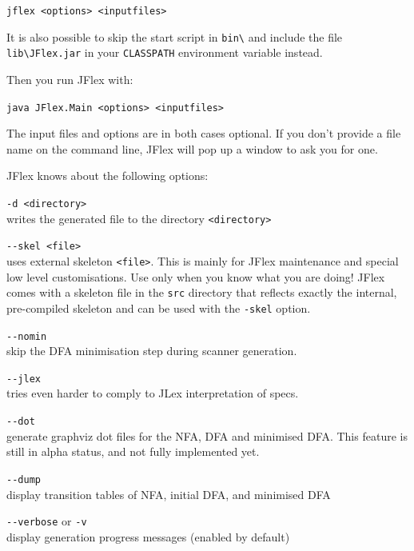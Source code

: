 \documentclass[11pt]{scrartcl}
\begin{document}
\texttt{jflex <options> <inputfiles>}

It is also possible to skip the start script in \verb+bin\+
and include the file \verb+lib\JFlex.jar+
in your \texttt{CLASSPATH} environment variable instead.

Then you run JFlex with:

\texttt{java JFlex.Main <options> <inputfiles>}

The input files and options are in both cases optional. If you don't provide a file name on
the command line, JFlex will pop up a window to ask you for one.

JFlex knows about the following options:

\begin{description}
\item \verb+-d <directory>+\\
  writes the generated file to the directory \verb+<directory>+
  

\item \verb+--skel <file>+\\
  uses external skeleton \verb+<file>+. This is mainly for JFlex
  maintenance and special low level customisations. Use only when you
  know what you are doing! JFlex comes with a skeleton file in the
  \texttt{src} directory that reflects exactly the internal, pre-compiled
  skeleton and can be used with the \texttt{-skel} option.

\item \verb+--nomin+\\
  skip the DFA minimisation step during scanner generation.

\item \verb+--jlex+\\
  tries even harder to comply to JLex interpretation of specs.

\item \verb+--dot+\\
  generate graphviz dot files for the NFA, DFA and minimised 
  DFA. This feature is still in alpha status, and not
  fully implemented yet. 

\item \verb+--dump+\\
  display transition tables of NFA, initial DFA, and minimised DFA 

\item \verb+--verbose+ or \texttt{-v}\\
  display generation progress messages (enabled by default)


\end{description}
\end{document}
